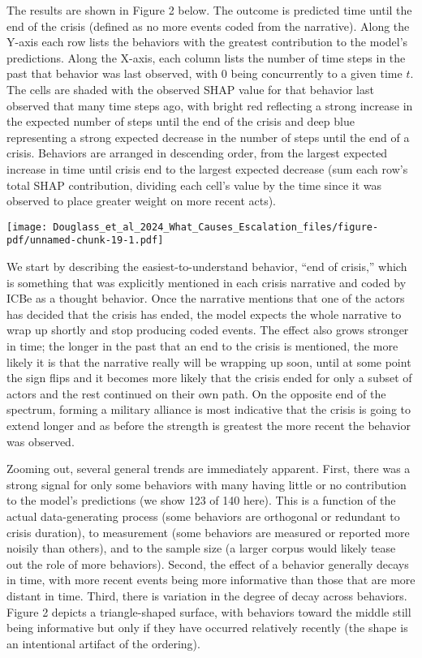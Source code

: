 \documentclass[
  letterpaper,
  DIV=11,
  numbers=noendperiod]{scrartcl}
\begin{document}
The results are shown in Figure 2 below. The outcome is predicted time
until the end of the crisis (defined as no more events coded from the
narrative). Along the Y-axis each row lists the behaviors with the
greatest contribution to the model's predictions. Along the X-axis, each
column lists the number of time steps in the past that behavior was last
observed, with 0 being concurrently to a given time \(t\). The cells are
shaded with the observed SHAP value for that behavior last observed that
many time steps ago, with bright red reflecting a strong increase in the
expected number of steps until the end of the crisis and deep blue
representing a strong expected decrease in the number of steps until the
end of a crisis. Behaviors are arranged in descending order, from the
largest expected increase in time until crisis end to the largest
expected decrease (sum each row's total SHAP contribution, dividing each
cell's value by the time since it was observed to place greater weight
on more recent acts).

\texttt{[image: Douglass\_et\_al\_2024\_What\_Causes\_Escalation\_files/figure-pdf/unnamed-chunk-19-1.pdf]}

We start by describing the easiest-to-understand behavior, ``end of
crisis,'' which is something that was explicitly mentioned in each
crisis narrative and coded by ICBe as a thought behavior. Once the
narrative mentions that one of the actors has decided that the crisis
has ended, the model expects the whole narrative to wrap up shortly and
stop producing coded events. The effect also grows stronger in time; the
longer in the past that an end to the crisis is mentioned, the more
likely it is that the narrative really will be wrapping up soon, until
at some point the sign flips and it becomes more likely that the crisis
ended for only a subset of actors and the rest continued on their own
path. On the opposite end of the spectrum, forming a military alliance
is most indicative that the crisis is going to extend longer and as
before the strength is greatest the more recent the behavior was
observed.

Zooming out, several general trends are immediately apparent. First,
there was a strong signal for only some behaviors with many having
little or no contribution to the model's predictions (we show 123 of 140
here). This is a function of the actual data-generating process (some
behaviors are orthogonal or redundant to crisis duration), to
measurement (some behaviors are measured or reported more noisily than
others), and to the sample size (a larger corpus would likely tease out
the role of more behaviors). Second, the effect of a behavior generally
decays in time, with more recent events being more informative than
those that are more distant in time. Third, there is variation in the
degree of decay across behaviors. Figure 2 depicts a triangle-shaped
surface, with behaviors toward the middle still being informative but
only if they have occurred relatively recently (the shape is an
intentional artifact of the ordering).
\end{document}
